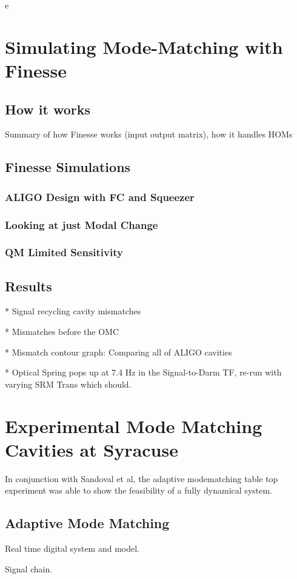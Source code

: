 \documentclass[oneside]{book}
\begin{document}
	
e\chapter{Simulating Mode-Matching with Finesse}	
	\section{How it works}
	Summary of how Finesse works (input output matrix), how it handles HOMs
	\section{Finesse Simulations}
		\subsection{ALIGO Design with FC and Squeezer}
		\subsection{Looking at just Modal Change}
		\subsection{QM Limited Sensitivity}
			
	\section{Results}
		* Signal recycling cavity mismatches

		* Mismatches before the OMC
			
		* Mismatch contour graph: Comparing all of ALIGO cavities
		
		* Optical Spring pops up at 7.4 Hz in the Signal-to-Darm TF, re-run with varying SRM Trans which should.

\chapter{Experimental Mode Matching Cavities at Syracuse}
In conjunction with Sandoval et al, the adaptive modematching table top experiment was able to show the feasibility of a fully dynamical system.
	\section{Adaptive Mode Matching}
	Real time digital system and model.
	
	Signal chain.
	
\end{document}
